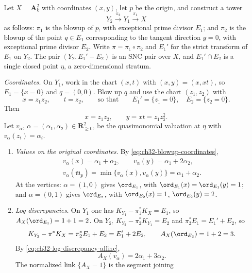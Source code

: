 \begin{example}
\label{ex:ch32-blowup-surface}
Let $X=\mathbf A^2_k$ with coordinates $(x,y)$, let $p$ be the origin,
and construct a tower
\[
 Y_2\xrightarrow{\ \pi_2\ }Y_1\xrightarrow{\ \pi_1\ }X
\]
as follows: $\pi_1$ is the blowup of $p$, with exceptional prime divisor
$E_1$; and $\pi_2$ is the blowup of the point $q\in E_1$ corresponding
to the tangent direction $y=0$, with exceptional prime divisor $E_2$.
Write $\pi=\pi_1\circ\pi_2$ and $E_1'$ for the strict transform of
$E_1$ on $Y_2$.  The pair $(Y_2,E_1'+E_2)$ is an SNC pair over
$X$, and $E_1'\cap E_2$ is a single closed point $\eta$, a
zero-dimensional stratum.

\emph{Coordinates.}  On $Y_1$, work in the chart $(x,t)$ with
$(x,y)=(x,xt)$, so $E_1=\{x=0\}$ and $q=(0,0)$.  Blow up $q$ and use
the chart $(z_1,z_2)$ with
\[
 x=z_1z_2,\qquad t=z_2 ,
 \qquad\text{so that}\qquad
 E_1'=\{z_1=0\},\quad E_2=\{z_2=0\}.
\]
Then
\begin{equation}
\label{eq:ch32-blowup-coordinates}
 x=z_1z_2,\qquad y=xt=z_1z_2^2 .
\end{equation}
Let $v_\alpha$, $\alpha=(\alpha_1,\alpha_2)\in\mathbf R^2_{\geq0}$, be
the quasimonomial valuation at $\eta$ with $v_\alpha(z_i)=\alpha_i$.
\begin{enumerate}
\item\label{itm:ch32-bs:values}
\emph{Values on the original coordinates.}  By
\eqref{eq:ch32-blowup-coordinates},
\[
\begin{gathered}
 v_\alpha(x)=\alpha_1+\alpha_2,
 \qquad
 v_\alpha(y)=\alpha_1+2\alpha_2,\\
 v_\alpha(\mathfrak m_p)=\min\{v_\alpha(x),v_\alpha(y)\}
 =\alpha_1+\alpha_2 .
\end{gathered}
\]
At the vertices: $\alpha=(1,0)$ gives $\ord_{E_1}$, with
$\ord_{E_1}(x)=\ord_{E_1}(y)=1$; and $\alpha=(0,1)$ gives
$\ord_{E_2}$, with $\ord_{E_2}(x)=1$, $\ord_{E_2}(y)=2$.
\item\label{itm:ch32-bs:discrepancy}
\emph{Log discrepancies.}  On $Y_1$ one has
$K_{Y_1}-\pi_1^*K_X=E_1$, so $A_X(\ord_{E_1})=1+1=2$.  On $Y_2$,
$K_{Y_2}-\pi_2^*K_{Y_1}=E_2$ and $\pi_2^*E_1=E_1'+E_2$, so
\[
 K_{Y_2}-\pi^*K_X=\pi_2^*E_1+E_2=E_1'+2E_2,
 \qquad
 A_X(\ord_{E_2})=1+2=3 .
\]
By \eqref{eq:ch32-log-discrepancy-affine},
\begin{equation}
\label{eq:ch32-blowup-discrepancy}
 A_X(v_\alpha)=2\alpha_1+3\alpha_2 .
\end{equation}
The normalized link $\{A_X=1\}$ is the segment joining

\end{enumerate}
\end{example}
